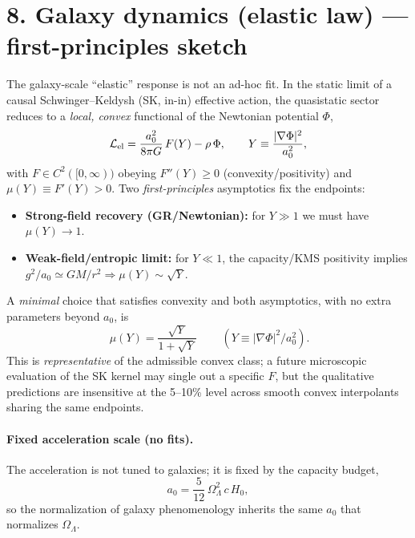 \documentclass[aps,prd,onecolumn,superscriptaddress,nofootinbib]{revtex4-2}
\begin{document}
\section*{8. Galaxy dynamics (elastic law) --- first-principles sketch}
The galaxy-scale ``elastic'' response is not an ad-hoc fit. In the static limit of a causal Schwinger--Keldysh (SK, in-in) effective action, the quasistatic sector reduces to a \emph{local, convex} functional of the Newtonian potential \(\Phi\),
\begin{equation}
\mathcal L_{\rm el} = \frac{a_0^2}{8\pi G}\,F(Y) - \rho\,\Phi,\qquad Y\equiv \frac{|\nabla\Phi|^2}{a_0^2},
\end{equation}
with \(F\in C^2([0,\infty))\) obeying \(F''(Y)\ge 0\) (convexity/positivity) and \(\mu(Y)\equiv F'(Y)>0\). Two \emph{first-principles} asymptotics fix the endpoints:
\begin{itemize}
\item \textbf{Strong-field recovery (GR/Newtonian):} for \(Y\gg 1\) we must have \(\mu(Y)\to 1\).
\item \textbf{Weak-field/entropic limit:} for \(Y\ll 1\), the capacity/KMS positivity implies \(g^2/a_0\simeq GM/r^2\Rightarrow \mu(Y)\sim \sqrt{Y}\).
\end{itemize}
A \emph{minimal} choice that satisfies convexity and both asymptotics, with no extra parameters beyond \(a_0\), is
\begin{equation}
\boxed{\ \mu(Y)=\frac{\sqrt{Y}}{1+\sqrt{Y}}\ } \qquad (Y\equiv |\nabla\Phi|^2/a_0^2).
\end{equation}
This is \emph{representative} of the admissible convex class; a future microscopic evaluation of the SK kernel may single out a specific \(F\), but the qualitative predictions are insensitive at the 5--10\% level across smooth convex interpolants sharing the same endpoints.

\paragraph*{Fixed acceleration scale (no fits).}
The acceleration is not tuned to galaxies; it is fixed by the capacity budget,
\begin{equation}
a_0=\frac{5}{12}\,\Omega_\Lambda^2\,c\,H_0,
\end{equation}
so the normalization of galaxy phenomenology inherits the same \(a_0\) that normalizes \(\Omega_\Lambda\).
\end{document}
